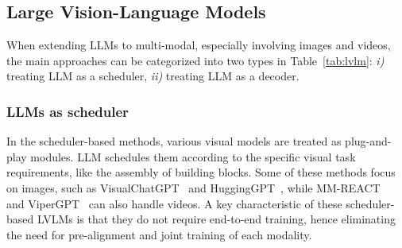 \subsection{Large Vision-Language Models}
When extending LLMs to multi-modal, especially involving images and videos, the main approaches can be categorized into two types in Table~\ref{tab:lvlm}: \textit{i)} treating LLM as a scheduler, \textit{ii)} treating LLM as a decoder.

\subsubsection{LLMs as scheduler} In the scheduler-based methods, various visual models are treated as plug-and-play modules. LLM schedules them according to the specific visual task requirements, like the assembly of building blocks. Some of these methods focus on images, such as VisualChatGPT~\cite{wu2023visual} and HuggingGPT~\cite{shen2023hugginggpt}, while MM-REACT~\cite{yang2023mm} and ViperGPT~\cite{suris2023vipergpt} can also handle videos. A key characteristic of these scheduler-based LVLMs is that they do not require end-to-end training, hence eliminating the need for pre-alignment and joint training of each modality. 

